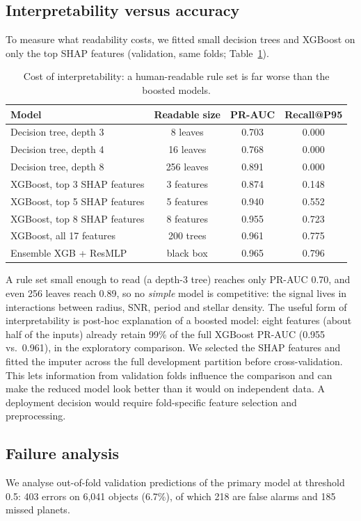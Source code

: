 \documentclass[11pt,a4paper]{article}
\begin{document}
\subsection{Interpretability versus accuracy}\label{sec:interp}
To measure what readability costs, we fitted small decision trees and XGBoost on only the top SHAP features (validation, same folds; Table~\ref{tab:interp}).
\begin{table}[H]\centering\small
\begin{tabular}{@{}lccc@{}}\toprule
Model & Readable size & PR-AUC & Recall@P95\\\midrule
Decision tree, depth 3 & 8 leaves & 0.703 & 0.000\\
Decision tree, depth 4 & 16 leaves & 0.768 & 0.000\\
Decision tree, depth 8 & 256 leaves & 0.891 & 0.000\\
XGBoost, top 3 SHAP features & 3 features & 0.874 & 0.148\\
XGBoost, top 5 SHAP features & 5 features & 0.940 & 0.552\\
XGBoost, top 8 SHAP features & 8 features & 0.955 & 0.723\\
XGBoost, all 17 features & 200 trees & 0.961 & 0.775\\
Ensemble XGB + ResMLP & black box & 0.965 & 0.796\\\bottomrule
\end{tabular}
\caption{Cost of interpretability: a human-readable rule set is far worse than the boosted models.}\label{tab:interp}
\end{table}
A rule set small enough to read (a depth-3 tree) reaches only PR-AUC 0.70, and even 256 leaves reach 0.89, so no \emph{simple} model is competitive: the signal lives in interactions between radius, SNR, period and stellar density. The useful form of interpretability is post-hoc explanation of a boosted model: eight features (about half of the inputs) already retain 99\% of the full XGBoost PR-AUC (0.955 vs.\ 0.961), in the exploratory comparison. We selected the SHAP features and fitted the imputer across the full development partition before cross-validation. This lets information from validation folds influence the comparison and can make the reduced model look better than it would on independent data. A deployment decision would require fold-specific feature selection and preprocessing.

\subsection{Failure analysis}\label{sec:fail}
We analyse out-of-fold validation predictions of the primary model at threshold 0.5: 403 errors on 6,041 objects (6.7\%), of which 218 are false alarms and 185 missed planets.
\end{document}
